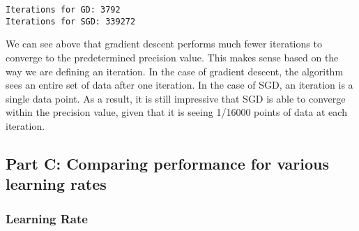 \documentclass[11pt]{article}
\begin{document}
    \begin{Verbatim}[commandchars=\\\{\}]
Iterations for GD: 3792
Iterations for SGD: 339272

    \end{Verbatim}

    We can see above that gradient descent performs much fewer iterations to
converge to the predetermined precision value. This makes sense based on
the way we are defining an iteration. In the case of gradient descent,
the algorithm sees an entire set of data after one iteration. In the
case of SGD, an iteration is a single data point. As a result, it is
still impressive that SGD is able to converge within the precision
value, given that it is seeing 1/16000 points of data at each iteration.

    \subsection{Part C: Comparing performance for various learning
rates}\label{part-c-comparing-performance-for-various-learning-rates}

    \subsubsection{Learning Rate}\label{learning-rate}
\end{document}
